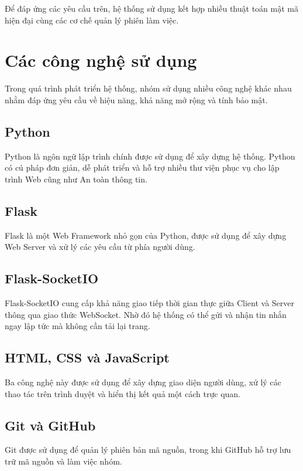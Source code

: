 Để đáp ứng các yêu cầu trên, hệ thống sử dụng kết hợp nhiều thuật toán mật mã hiện đại cùng các cơ chế quản lý phiên làm việc.

\section{Các công nghệ sử dụng}

Trong quá trình phát triển hệ thống, nhóm sử dụng nhiều công nghệ khác nhau nhằm đáp ứng yêu cầu về hiệu năng, khả năng mở rộng và tính bảo mật.

\subsection{Python}

Python là ngôn ngữ lập trình chính được sử dụng để xây dựng hệ thống. Python có cú pháp đơn giản, dễ phát triển và hỗ trợ nhiều thư viện phục vụ cho lập trình Web cũng như An toàn thông tin.

\subsection{Flask}

Flask là một Web Framework nhỏ gọn của Python, được sử dụng để xây dựng Web Server và xử lý các yêu cầu từ phía người dùng.

\subsection{Flask-SocketIO}

Flask-SocketIO cung cấp khả năng giao tiếp thời gian thực giữa Client và Server thông qua giao thức WebSocket. Nhờ đó hệ thống có thể gửi và nhận tin nhắn ngay lập tức mà không cần tải lại trang.

\subsection{HTML, CSS và JavaScript}

Ba công nghệ này được sử dụng để xây dựng giao diện người dùng, xử lý các thao tác trên trình duyệt và hiển thị kết quả một cách trực quan.

\subsection{Git và GitHub}

Git được sử dụng để quản lý phiên bản mã nguồn, trong khi GitHub hỗ trợ lưu trữ mã nguồn và làm việc nhóm.

